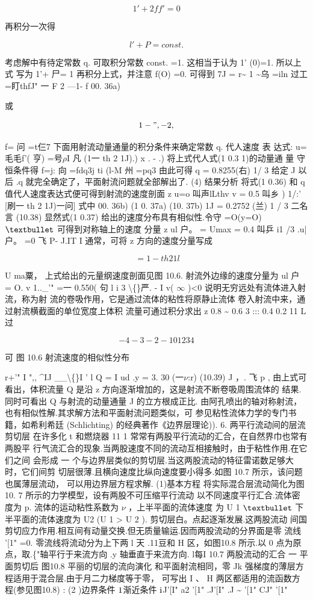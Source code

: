 \[1'+2ff' = 0\]

再积分一次得

\[l' + P = const.\]

考虑解中有待定常数 q. 可取积分常数 const. =1. 这相当于认为 1' (0)=1. 所以上式 写为 1'+ 尸= 1 再积分上式，并注意 f(O) =0. 可得到 7J = r\textasciitilde{} 1 \textasciitilde{}乌 =iln 过工=盯thfJ" 一 F 2 ---1- f 00. 36a)

或

\[1 - ",-2,\]

f= 问 =t仨7 下面用射流动量通量的积分条件来确定常数 q. 代人速度 表 达式: u= 毛毛f'( 亨) =号$\rho$I 凡 (1一 th 2 1J).) x . - .) 将上式代人式(1 0.3 1)的动量通 量 守恒条件得 f=j: 向 =fdq3j ti (l-M 州 =pq3 由此可得 q = 0.8255(右) 1/ 3 给定 J 以后 .q 就完全确定了，平面射流问题就全部解出了. (4) 结果分析 将式(1 0.36) 和 q 值代人速度表达式便可得到射流的速度剖面 z u=o 叫声lLthv v = 0.5 叫乡 ) 1/:' [刷一 th 2 1J)一问] 式中 00. 36b) (1 0. 37a) (10. 37b) 1J = 0.2752 (兰) 1 / 3 二名言 (10.38) 显然式(1 0.37) 给出的速度分布具有相似性.令守 =O(y=O) ${\rm •}$ 可得到对称轴上的速度 分量 z ul 户。 = Umax = 0.4 叫乒 i1 /3 .u| 户。 =0 飞 P- J.IT I 通常，可将 z 方向的速度分量写成

\[~=1-th2 1l\]

U ma粟， 上式给出的元量纲速度剖面见图 10.6. 射流外边缘的速度分量为 ul 户 = O. v 1..\_'" =一 0.550( 句 l i 3 \textbackslash\{\}严. - I v( $\infty$ )<0 说明无穷远处有流体进入射流，称为射 流的卷吸作用，它是通过流体的粘性将原静止流体 卷入射流中来，通过射流横截面的单位宽度上体积 流量可通过积分求出 z 0.8 \textasciitilde{} 0.6 3 ::: 0.4 0.2 11 L 过

\[-4 -3 -2 -1 0 1 2 3 4\]

可 图 10.6 射流速度的相似性分布

r+'" I ",, \textasciicircum{}IJ \_\_\textbackslash\{\}I ' l Q = I ud .y = 3. 30 (一$\nu$:r) (10.39) J ，. 飞 p , 由上式可看出，体积流量 Q 是沿 z 方向逐渐增加的，这是射流不断卷吸周围流体的 结果.同时可看出 Q 与射流的动量通量 J 的立方根成正比. 由阿孔喷出的轴对称射流，也有相似性解.其求解方法和平面射流问题类似，可 参见粘性流体力学的专门书籍，如希利希廷 (Schlichting) 的经典著作《边界层理论)). 6. 两平行流动间的层流剪切层 在许多化 t 和燃烧器 11 1 常常有两股平行流动的汇合，在自然界巾也常有两股平 行气流汇合的现象.当两股速度不同的流动互相接触时，由于粘性作用.在它们之间 会形成 一 个与边界层类似的剪切层.当这两股流动的特征雷诺数足够大时，它们间剪 切层很薄.且横向速度比纵向速度要小得多.如图 10.7 所示，该问题也属薄层流动， 可以用边界层方程求解. (1)基本方程 将实际混合层流动简化为图 10. 7 所示的力学模型，设有两股不可压缩平行流动 以不同速度平行汇合.流体密度为 p. 流体的运动粘性系数为 $\nu$ ，上半平面的流体速度 为 U 1 ${\rm •}$ 下半平面的流体速度为 U2 (U 1 > U 2 ). 剪切层白。点起逐渐发展.这两股流动 间国剪切应力作用.相互间有动量交换.但无质量输运.因而两股流动的分界面是零 流线 '[1" =0. 零流线将流动分为上下两 l 天 .11豆和 H 区，如图10.8 所示.以 0 点为原 点，取.\{"轴平行于来流方向 .y 轴垂直于来流方向. l每I 10.7 两股流动的汇合 一 平面剪切后 图10.8 平丽的切层的流向演化 和平面射流相同，零 Jk 强梯度的薄层方程适用于混合层.由于月二力梯度等于零， 可写出 I 、 H 两区都适用的流函数方程(参见图10.8) : (2 )边界条件 ${\rm 1}$渐近条件 ${\rm i}$J'[I" a2 '[1" .J'[I" .J \textasciitilde{} '[1" CJ" '[1"

